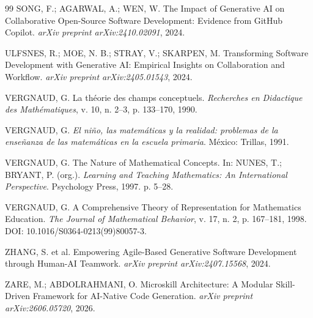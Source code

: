 \documentclass[preprint,12pt,authoryear]{elsarticle}
\begin{document}
\begin{thebibliography}{99}
SONG, F.; AGARWAL, A.; WEN, W. The Impact of Generative AI on Collaborative Open-Source Software Development: Evidence from GitHub Copilot. \emph{arXiv preprint arXiv:2410.02091}, 2024.

ULFSNES, R.; MOE, N. B.; STRAY, V.; SKARPEN, M. Transforming Software Development with Generative AI: Empirical Insights on Collaboration and Workflow. \emph{arXiv preprint arXiv:2405.01543}, 2024.

VERGNAUD, G. La théorie des champs conceptuels. \emph{Recherches en Didactique des Mathématiques}, v. 10, n. 2--3, p. 133--170, 1990.

VERGNAUD, G. \emph{El niño, las matemáticas y la realidad: problemas de la enseñanza de las matemáticas en la escuela primaria}. México: Trillas, 1991.

VERGNAUD, G. The Nature of Mathematical Concepts. In: NUNES, T.; BRYANT, P. (org.). \emph{Learning and Teaching Mathematics: An International Perspective}. Psychology Press, 1997. p. 5--28.

VERGNAUD, G. A Comprehensive Theory of Representation for Mathematics Education. \emph{The Journal of Mathematical Behavior}, v. 17, n. 2, p. 167--181, 1998. DOI: 10.1016/S0364-0213(99)80057-3.

ZHANG, S. et al. Empowering Agile-Based Generative Software Development through Human-AI Teamwork. \emph{arXiv preprint arXiv:2407.15568}, 2024.

ZARE, M.; ABDOLRAHMANI, O. Microskill Architecture: A Modular Skill-Driven Framework for AI-Native Code Generation. \emph{arXiv preprint arXiv:2606.05720}, 2026.
\end{thebibliography}
\end{document}
